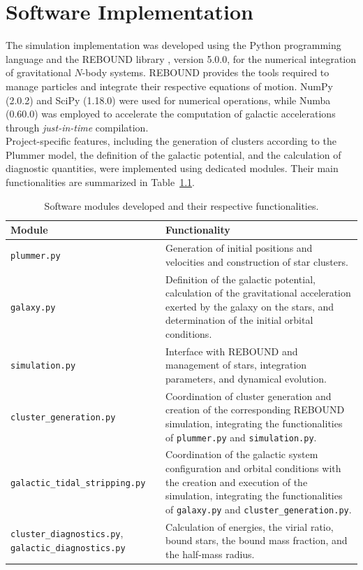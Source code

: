 \chapter{Software Implementation}
\label{cha:implementazione-software}
The simulation implementation was developed using the Python programming language \cite{vanrossum2009python} and the REBOUND library \cite{rein2012rebound}, version 5.0.0, for the numerical integration of gravitational $N$-body systems. REBOUND provides the tools required to manage particles and integrate their respective equations of motion. NumPy (2.0.2) \cite{harris2020array} and SciPy (1.18.0) \cite{virtanen2020scipy} were used for numerical operations, while Numba (0.60.0) \cite{lam2015numba} was employed to accelerate the computation of galactic accelerations through \emph{just-in-time} compilation.\\
Project-specific features, including the generation of clusters according to the Plummer model, the definition of the galactic potential, and the calculation of diagnostic quantities, were implemented using dedicated modules. Their main functionalities are summarized in Table~\ref{tab:moduli-software}.
\begin{table}[H]
	\centering
	\small
	\caption{Software modules developed and their respective functionalities.}
	\label{tab:moduli-software}
	\begin{tabular}{p{}p{}}
		\hline
		\textbf{Module} & \textbf{Functionality} \\
		\hline
		\texttt{plummer.py} &
		Generation of initial positions and velocities and construction of star clusters. \\
		\hline
		\texttt{galaxy.py} &
		Definition of the galactic potential, calculation of the gravitational acceleration exerted by the galaxy on the stars, and determination of the initial orbital conditions. \\
		\hline
		\texttt{simulation.py} &
		Interface with REBOUND and management of stars, integration parameters, and dynamical evolution. \\
		\hline
		\texttt{cluster\_generation.py} &
		Coordination of cluster generation and creation of the corresponding REBOUND simulation, integrating the functionalities of \texttt{plummer.py} and \texttt{simulation.py}. \\
		\hline
		\texttt{galactic\_tidal\_stripping.py} &
		Coordination of the galactic system configuration and orbital conditions with the creation and execution of the simulation, integrating the functionalities of \texttt{galaxy.py} and \texttt{cluster\_generation.py}. \\
		\hline
		\texttt{cluster\_diagnostics.py}, \texttt{galactic\_diagnostics.py} &
		Calculation of energies, the virial ratio, bound stars, the bound mass fraction, and the half-mass radius. \\
		\hline
	\end{tabular}
\end{table}
